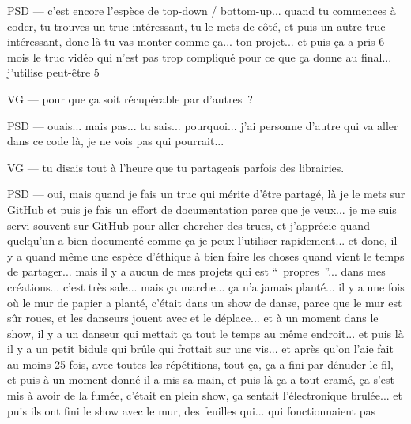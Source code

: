 PSD — c'est encore l'espèce de top-down / bottom-up... quand tu commences à coder, tu trouves un truc intéressant, tu le mets de côté, et puis un autre truc intéressant, donc là tu vas monter comme ça... ton projet... et puis ça a pris 6 mois le truc vidéo qui n'est pas trop compliqué pour ce que ça donne au final... j'utilise peut-être 5 %

VG — pour que ça soit récupérable par d'autres ?

PSD — ouais... mais pas... tu sais... pourquoi... j'ai personne d'autre qui va aller dans ce code là, je ne vois pas qui pourrait...

VG — tu disais tout à l'heure que tu partageais parfois des librairies.

PSD — oui, mais quand je fais un truc qui mérite d'être partagé, là je le mets sur GitHub et puis je fais un effort de documentation parce que je veux...  je me suis servi souvent sur GitHub pour aller chercher des trucs, et j'apprécie quand quelqu'un a bien documenté comme ça je peux l'utiliser rapidement... et donc, il y a quand même une espèce d'éthique à bien faire les choses quand vient le temps de partager... mais il y a aucun de mes projets qui est “ propres ”... dans mes créations... c'est très sale... mais ça marche... ça n'a jamais planté... il y a une fois où le mur de papier a planté, c'était dans un show de danse, parce que le mur est sûr roues, et les danseurs jouent avec et le déplace... et à un moment dans le show, il y a un danseur qui mettait ça tout le temps au même endroit... et puis là il y a un petit bidule qui brûle qui frottait sur une vis... et après qu'on l'aie fait au moins 25 fois, avec toutes les répétitions, tout ça, ça a fini par dénuder le fil, et puis à un moment donné il a mis sa main, et puis là ça a tout cramé, ça s'est mis à avoir de la fumée, c'était en plein show, ça sentait l'électronique brulée... et puis ils ont fini le show avec le mur, des feuilles qui... qui fonctionnaient pas 

